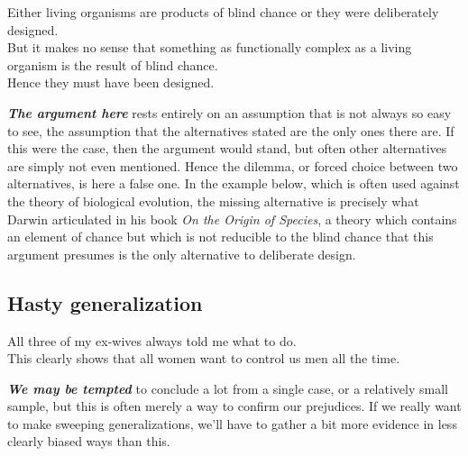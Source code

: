 \documentclass[
  12pt, openany]{book}
\theoremstyle{definition}
\theoremstyle{definition}
\theoremstyle{definition}
\theoremstyle{remark}
\begin{document}
\begin{center}

\begin{argument}

Either living organisms are products of blind chance or they were deliberately designed.\\
But it makes no sense that something as functionally complex as a living organism is the result of blind chance.\\

Hence they must have been designed.

\end{argument}

\end{center}

\textbf{\emph{The argument here}} rests entirely on an assumption that is not always so easy to see, the assumption that the alternatives stated are the only ones there are. If this were the case, then the argument would stand, but often other alternatives are simply not even mentioned. Hence the dilemma, or forced choice between two alternatives, is here a false one. In the example below, which is often used against the theory of biological evolution, the missing alternative is precisely what Darwin articulated in his book \emph{On the Origin of Species}, a theory which contains an element of chance but which is not reducible to the blind chance that this argument presumes is the only alternative to deliberate design.

\hypertarget{hasty-generalization}{%
\subsection*{Hasty generalization}\label{hasty-generalization}}


\begin{center}

\begin{argument}

All three of my ex-wives always told me what to do.\\

This clearly shows that all women want to control us men all the time.

\end{argument}

\end{center}

\textbf{\emph{We may be tempted}} to conclude a lot from a single case, or a relatively small sample, but this is often merely a way to confirm our prejudices. If we really want to make sweeping generalizations, we'll have to gather a bit more evidence in less clearly biased ways than this.
\end{document}
